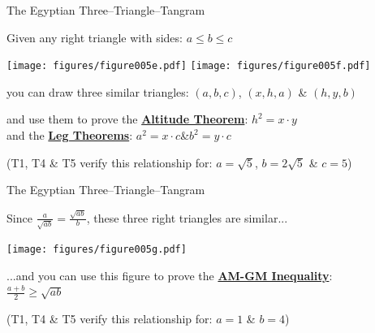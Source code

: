 \documentclass[14pt]{beamer}
\begin{document}
    \begin{frame}{The Egyptian Three--Triangle--Tangram}
        \begin{center}
            Given any right triangle with sides: {\small $a \leq b \leq c$}

            \bigskip\bigskip

            \texttt{[image: figures/figure005e.pdf]}\quad
            \texttt{[image: figures/figure005f.pdf]}

            \bigskip

            {\small you can draw three similar triangles: {\footnotesize $(a,b,c)$,\; $(x,h,a)$\; \&\; $(h,y,b)$}\\\bigskip

            and use them to prove the \textbf{\href{https://en.wikipedia.org/wiki/Geometric_mean_theorem}{Altitude Theorem}}: {\footnotesize $h^{2} = x\cdot y$}\\and the \textbf{\href{https://en.wikipedia.org/wiki/Right_triangle\#Altitudes}{Leg Theorems}}: {\footnotesize$a^{2} = x\cdot c$\quad \&\quad $b^{2} = y\cdot c$}}

            \bigskip

            {\footnotesize (T1, T4 \& T5 verify this relationship for: $a=\sqrt{5}$,\; $b=2\sqrt{5}$\; \&\; $c=5$)}
        \end{center}
    \end{frame}


    \begin{frame}{The Egyptian Three--Triangle--Tangram}
        \begin{center}
            Since {\small $\frac{a}{\sqrt{\!ab}} = \tfrac{\sqrt{\!ab}}{b}$}, these three right triangles are similar...

            \medskip

            \texttt{[image: figures/figure005g.pdf]}

            \bigskip

            {\small ...and you can use this figure to prove the \textbf{\href{https://en.wikipedia.org/wiki/Inequality_of_arithmetic_and_geometric_means}{AM-GM Inequality}}:\\\medskip$\displaystyle\frac{a+b}{2} \geq \sqrt{\!ab}$}\\

            \bigskip

            {\footnotesize (T1, T4 \& T5 verify this relationship for: $a=1$\; \&\; $b=4$)}
        \end{center}
    \end{frame}
\end{document}

